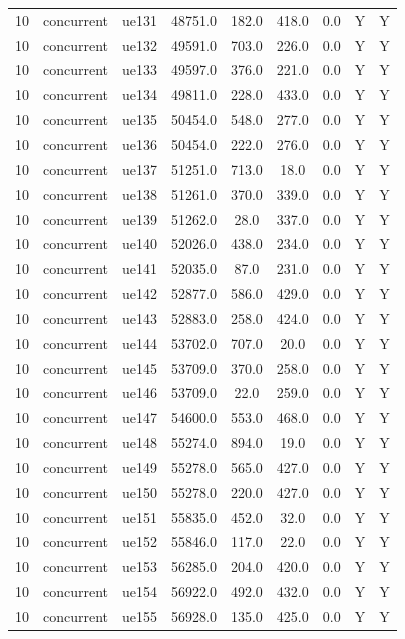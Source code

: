 \begin{table}[ht]
\begin{tabular}{|c|c|c|c|c|c|c|c|c|}
10 & concurrent & ue131 & 48751.0 & 182.0 & 418.0 & 0.0 & Y & Y \\
10 & concurrent & ue132 & 49591.0 & 703.0 & 226.0 & 0.0 & Y & Y \\
10 & concurrent & ue133 & 49597.0 & 376.0 & 221.0 & 0.0 & Y & Y \\
10 & concurrent & ue134 & 49811.0 & 228.0 & 433.0 & 0.0 & Y & Y \\
10 & concurrent & ue135 & 50454.0 & 548.0 & 277.0 & 0.0 & Y & Y \\
10 & concurrent & ue136 & 50454.0 & 222.0 & 276.0 & 0.0 & Y & Y \\
10 & concurrent & ue137 & 51251.0 & 713.0 & 18.0 & 0.0 & Y & Y \\
10 & concurrent & ue138 & 51261.0 & 370.0 & 339.0 & 0.0 & Y & Y \\
10 & concurrent & ue139 & 51262.0 & 28.0 & 337.0 & 0.0 & Y & Y \\
10 & concurrent & ue140 & 52026.0 & 438.0 & 234.0 & 0.0 & Y & Y \\
10 & concurrent & ue141 & 52035.0 & 87.0 & 231.0 & 0.0 & Y & Y \\
10 & concurrent & ue142 & 52877.0 & 586.0 & 429.0 & 0.0 & Y & Y \\
10 & concurrent & ue143 & 52883.0 & 258.0 & 424.0 & 0.0 & Y & Y \\
10 & concurrent & ue144 & 53702.0 & 707.0 & 20.0 & 0.0 & Y & Y \\
10 & concurrent & ue145 & 53709.0 & 370.0 & 258.0 & 0.0 & Y & Y \\
10 & concurrent & ue146 & 53709.0 & 22.0 & 259.0 & 0.0 & Y & Y \\
10 & concurrent & ue147 & 54600.0 & 553.0 & 468.0 & 0.0 & Y & Y \\
10 & concurrent & ue148 & 55274.0 & 894.0 & 19.0 & 0.0 & Y & Y \\
10 & concurrent & ue149 & 55278.0 & 565.0 & 427.0 & 0.0 & Y & Y \\
10 & concurrent & ue150 & 55278.0 & 220.0 & 427.0 & 0.0 & Y & Y \\
10 & concurrent & ue151 & 55835.0 & 452.0 & 32.0 & 0.0 & Y & Y \\
10 & concurrent & ue152 & 55846.0 & 117.0 & 22.0 & 0.0 & Y & Y \\
10 & concurrent & ue153 & 56285.0 & 204.0 & 420.0 & 0.0 & Y & Y \\
10 & concurrent & ue154 & 56922.0 & 492.0 & 432.0 & 0.0 & Y & Y \\
10 & concurrent & ue155 & 56928.0 & 135.0 & 425.0 & 0.0 & Y & Y \\

\end{tabular}
\end{table}
